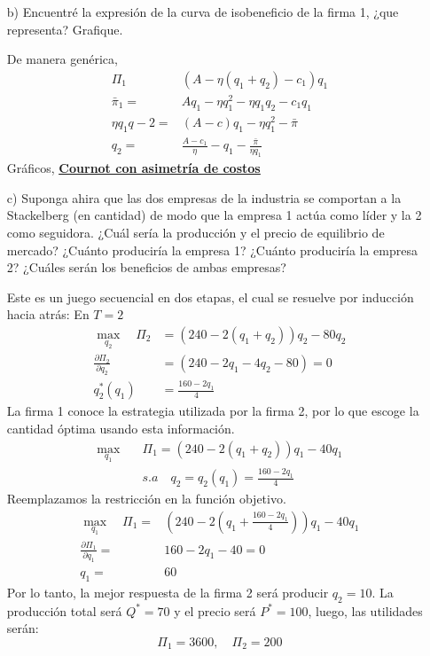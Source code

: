 \documentclass{exam}
\begin{document}
\begin{itemize}
\begin{solution}
    
\end{solution}
\item[b)] Encuentré la expresión de la curva de isobeneficio de la firma 1, ¿que representa? Grafique.
\begin{solution}
    De manera genérica, 
    \begin{align*}
        \Pi_1 & (A-\eta (q_1 + q_2) - c_1)q_1 \\
        \bar{\pi}_1 =& Aq_1 - \eta q_1^2 - \eta q_1q_2 - c_1q_1 \\
        \eta q_1 q-2 =& (A-c)q_1 - \eta q_1^2 - \bar{\pi} \\
        q_2 =& \frac{A-c_1}{\eta} - q_1 - \frac{\bar{\pi}}{\eta q_1}
    \end{align*}
    Gráficos, \underline{\textbf{\href{https://www.geogebra.org/calculator/yzfrawqb}{Cournot con asimetría de costos}}}
\end{solution}

\item[c)] Suponga ahira que las dos empresas de la industria se comportan a la Stackelberg (en cantidad) de modo que la empresa 1 actúa como líder y la 2 como seguidora. ¿Cuál sería la producción y el precio de equilibrio de mercado? ¿Cuánto produciría la empresa 1? ¿Cuánto produciría la empresa 2? ¿Cuáles serán los beneficios de ambas empresas?
\begin{solution}
    Este es un juego secuencial en dos etapas, el cual se resuelve por inducción hacia atrás: En \( T = 2 \)
    \begin{align*}
        \max_{q_2} \quad \Pi_2 &= (240 - 2(q_1 + q_2))q_2 - 80q_2 \\
        \frac{\partial \Pi_2}{\partial q_2} &= (240 - 2q_1 - 4q_2 - 80) = 0 \\
        q^*_2(q_1) &= \frac{160 - 2q_1}{4}
    \end{align*}
    La firma 1 conoce la estrategia utilizada por la firma 2, por lo que escoge la cantidad óptima usando esta información.
    \begin{align*}
        \max_{q_1} \quad &\Pi_1 = (240 - 2(q_1 + q_2))q_1 - 40q_1 \\
        &s.a \quad q_2 = q_2(q_1) = \frac{160 - 2q_1}{4}
    \end{align*}
    Reemplazamos la restricción en la función objetivo.
    \begin{align*}
        \max_{q_1} \quad  \Pi_1=& (240 - 2(q_1 + \frac{160 - 2q_1}{4}))q_1 - 40q_1 \\
        \frac{\partial \Pi_1}{\partial q_1} =& 160 - 2q_1 - 40 = 0 \\
        q_1 =&60
    \end{align*}
    Por lo tanto, la mejor respuesta de la firma 2 será producir \( q_2 = 10 \). La producción total será \( Q^* = 70 \) y el precio será \( P^* = 100 \), luego, las utilidades serán:
    \[
    \Pi_1 = 3600, \quad \Pi_2 = 200
    \]

\end{solution}
\end{itemize}
\end{document}
